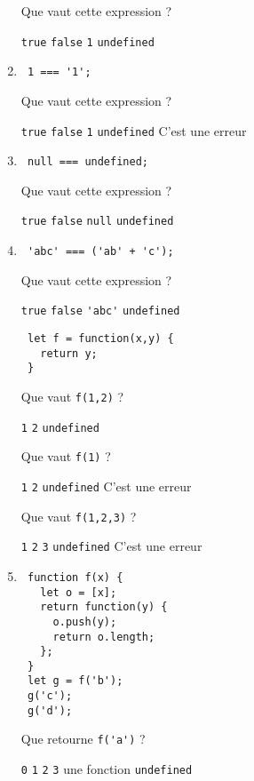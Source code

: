 \documentclass[a4paper, 12pt]{article}
\newcommand{\choice}[1]{\Square\hspace{2pt} #1\hspace{5pt}}
\newcommand{\choicec}[1]{\Square\hspace{2pt} \lstinline{#1}\hspace{5pt}}
\begin{document}
\begin{enumerate}
  Que vaut cette expression ?

  \choicec{true} \choicec{false} \choicec{1} \choicec{undefined}
  \newpage
\item \lstset{language=javascript}
\begin{lstlisting}
 1 === '1';
\end{lstlisting}

  Que vaut cette expression ?

  \choicec{true} \choicec{false} \choicec{1} \choicec{undefined} \choice{C'est une erreur}
\item \lstset{language=javascript}
\begin{lstlisting}
 null === undefined;
\end{lstlisting}

  Que vaut cette expression ?

  \choicec{true} \choicec{false} \choicec{null} \choicec{undefined}
\item \lstset{language=javascript}
\begin{lstlisting}
 'abc' === ('ab' + 'c');
\end{lstlisting}

  Que vaut cette expression ?

  \choicec{true} \choicec{false} \choicec{'abc'} \choicec{undefined}
\begin{lstlisting}
 let f = function(x,y) {
   return y;
 }
\end{lstlisting}

  Que vaut \lstinline{f(1,2)} ?

  \choicec{1} \choicec{2} \choicec{undefined}

  Que vaut \lstinline{f(1)} ?

  \choicec{1} \choicec{2} \choicec{undefined} \choice{C'est une erreur}

  Que vaut \lstinline{f(1,2,3)} ?

  \choicec{1} \choicec{2} \choicec{3} \choicec{undefined} \choice{C'est une erreur}
\item \lstset{language=javascript}
\begin{lstlisting}
 function f(x) {
   let o = [x];
   return function(y) {
     o.push(y);
     return o.length;
   };
 }
 let g = f('b');
 g('c');
 g('d');
\end{lstlisting}

  Que retourne \lstinline{f('a')} ?

  \choicec{0} \choicec{1} \choicec{2} \choicec{3} \choice{une fonction} \choicec{undefined}


\end{enumerate}
\end{document}
